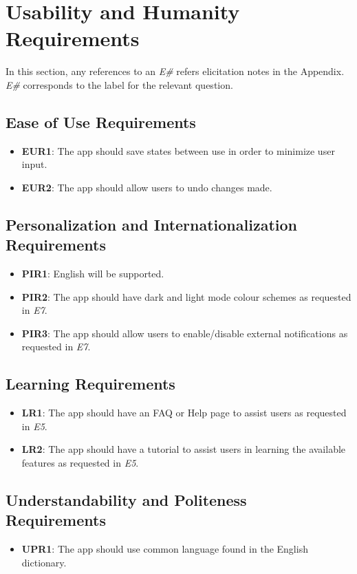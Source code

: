 \documentclass[12pt]{article}
\begin{document}
\section{Usability and Humanity Requirements}
In this section, any references to an \textit{E\#} refers elicitation notes in the Appendix. \textit{E\#} corresponds
to the label for the relevant question.

\subsection{Ease of Use Requirements}
\begin{itemize}
  \item \textbf{EUR1}: The app should save states between use in order to minimize user input.
  \item \textbf{EUR2}: The app should allow users to undo changes made.
\end{itemize}
\subsection{Personalization and Internationalization Requirements}
\begin{itemize}
  \item \textbf{PIR1}: English will be supported.
  \item \textbf{PIR2}: The app should have dark and light mode colour schemes as requested in \textit{E7}.
  \item \textbf{PIR3}: The app should allow users to enable/disable external notifications as requested in \textit{E7}.
\end{itemize}
\subsection{Learning Requirements}
\begin{itemize}
  \item \textbf{LR1}: The app should have an FAQ or Help page to assist users as requested in \textit{E5}.
  \item \textbf{LR2}: The app should have a tutorial to assist users in learning the available
  features as requested in \textit{E5}.
\end{itemize}
\subsection{Understandability and Politeness Requirements}
\begin{itemize}
  \item \textbf{UPR1}: The app should use common language found in the English dictionary.
\end{itemize}
\end{document}
